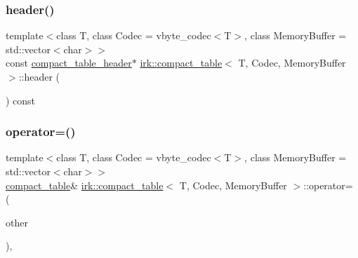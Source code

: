 \subsubsection{\texorpdfstring{header()}{header()}}
{\footnotesize\ttfamily template$<$class T, class Codec = vbyte\+\_\+codec$<$\+T$>$, class Memory\+Buffer = std\+::vector$<$char$>$$>$ \\
const \mbox{\hyperlink{structirk_1_1compact__table__header}{compact\+\_\+table\+\_\+header}}$\ast$ \mbox{\hyperlink{classirk_1_1compact__table}{irk\+::compact\+\_\+table}}$<$ T, Codec, Memory\+Buffer $>$\+::header (\begin{DoxyParamCaption}{ }\end{DoxyParamCaption}) const\hspace{0.3cm}{\ttfamily [inline]}}

\mbox{\label{classirk_1_1compact__table_a94d21b314eaaeb1e874b652aab4e3c57}} 
\subsubsection{\texorpdfstring{operator=()}{operator=()}\hspace{0.1cm}{\footnotesize\ttfamily [1/2]}}
{\footnotesize\ttfamily template$<$class T, class Codec = vbyte\+\_\+codec$<$\+T$>$, class Memory\+Buffer = std\+::vector$<$char$>$$>$ \\
\mbox{\hyperlink{classirk_1_1compact__table}{compact\+\_\+table}}\& \mbox{\hyperlink{classirk_1_1compact__table}{irk\+::compact\+\_\+table}}$<$ T, Codec, Memory\+Buffer $>$\+::operator= (\begin{DoxyParamCaption}\item[{\mbox{\hyperlink{classirk_1_1compact__table}{compact\+\_\+table}}$<$ T, Codec, Memory\+Buffer $>$ \&\&}]{other }\end{DoxyParamCaption})\hspace{0.3cm}{\ttfamily [default]}, {\ttfamily [noexcept]}}

\mbox{\label{classirk_1_1compact__table_a932785c03aaa201464a86435f8f8d23f}} 

